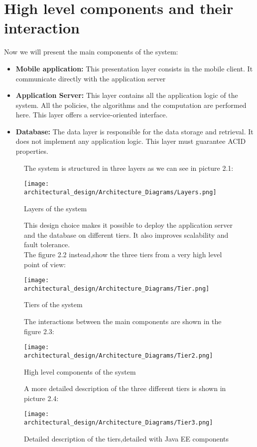 \section{High level components and their interaction}
Now we will present the main components of the system:
\begin{itemize}
\item \textbf{Mobile application:} This presentation layer consists in the mobile client. It communicate directly with the application server
\item \textbf{Application Server:} This layer contains all the application logic of the system. All the policies, the algorithms and the computation are performed here. This layer offers a service-oriented interface.
\item \textbf{Database:} The data layer is responsible for the data storage and retrieval. It does not implement any application logic. This layer must guarantee ACID properties. 
\end{itemize}

\begin{figure}
The system is structured in three layers as we can see in picture 2.1:
\begin{center}
\texttt{[image: architectural\_design/Architecture\_Diagrams/Layers.png]}
\caption{Layers of the system \label{fig:Layers}}
\end{center}
This design choice makes it possible to deploy the application server and the database on different tiers. It also improves scalability and fault tolerance.
\\
The figure 2.2 instead,show the three tiers from a very high level point of view:
\begin{center}
\texttt{[image: architectural\_design/Architecture\_Diagrams/Tier.png]}
\caption{Tiers of the system \label{fig:Layers}}
\end{center}
\end{figure}
\begin{figure}
The interactions between the main components are shown in the figure 2.3:
\begin{center}
\texttt{[image: architectural\_design/Architecture\_Diagrams/Tier2.png]}
\caption{High level components of the system \label{fig:Layers}}
\end{center}
\end{figure}
\begin{figure}
A more detailed description of the three different tiers is shown in picture 2.4:
\begin{center}
\texttt{[image: architectural\_design/Architecture\_Diagrams/Tier3.png]}
\caption{Detailed description of the tiers,detailed with Java EE components \label{fig:Layers}}
\end{center}
\end{figure}







